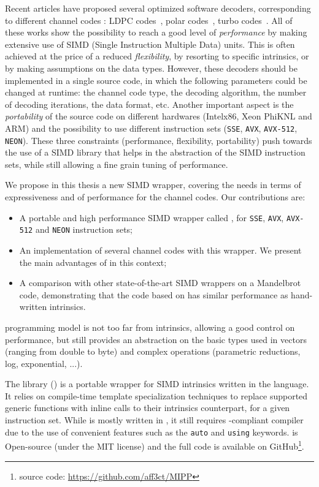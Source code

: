 Recent articles have proposed several optimized software decoders, corresponding
to different channel codes : LDPC codes~\cite{LeGal2015,LeGal2016}, polar
codes~\cite{Giard2016b,Sarkis2016,Cassagne2015c,Cassagne2016b}, turbo
codes~\cite{Zhang2012,Wu2013,Cassagne2016a}. All of these works show the
possibility to reach a good level of \textit{performance} by  making extensive
use of SIMD (Single Instruction Multiple Data) units. This is often achieved at
the price of a reduced \textit{flexibility}, by resorting to specific
intrinsics, or by making assumptions on the data types. However, these decoders
should be implemented in a single source code, in which the following parameters
could be changed at runtime: the channel code type, the decoding algorithm, the
number of decoding iterations, the data format, etc. Another important aspect is
the \textit{portability} of the source code on different hardwares (Intel\R x86,
Xeon Phi\TM KNL and ARM\R) and the possibility to use different instruction sets
(\verb|SSE|, \verb|AVX|, \verb|AVX-512|, \verb|NEON|). These three constraints
(performance, flexibility, portability) push towards the use of a SIMD library
that helps in the abstraction of the SIMD instruction sets, while still allowing
a fine grain tuning of performance.

We propose in this thesis a new \Cxx SIMD wrapper, covering the needs in terms
of expressiveness and of performance for the channel codes. Our contributions
are:
\begin{itemize}
  \item A portable and high performance  \Cxx SIMD wrapper called \MIPP, for
    \verb|SSE|, \verb|AVX|, \verb|AVX-512| and \verb|NEON| instruction sets;
  \item An implementation of several channel codes with this wrapper. We
    present the main advantages of \MIPP in this context;
  \item A comparison with other state-of-the-art SIMD wrappers on a Mandelbrot
    code, demonstrating that the code based on \MIPP has similar performance as
    hand-written intrinsics.
\end{itemize}
\MIPP programming model is not too far from intrinsics, allowing a good control
on performance, but still provides an abstraction on the basic types used in
vectors (ranging from double to byte) and complex operations (parametric
reductions, log, exponential, ...).

The \longMIPP library (\MIPP) is a portable wrapper for SIMD intrinsics written
in the \Cxx language. It relies on \Cxx compile-time template specialization
techniques to replace supported generic functions with inline calls to their
intrinsics counterpart, for a given instruction set. While \MIPP is mostly
written in , it still requires -compliant compiler due to the
use of convenient features such as the \verb|auto| and \verb|using| keywords.
\MIPP is Open-source (under the MIT license) and the full code is available on
GitHub\footnote{\MIPP source code: \url{https://github.com/aff3ct/MIPP}}.


